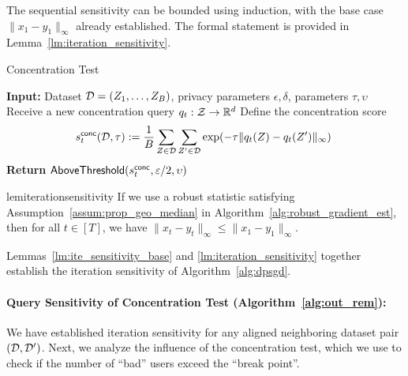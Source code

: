 The sequential sensitivity can be bounded using induction, with the base  
case $\|x_1 - y_1\|_\infty$ already established. The formal statement  
is provided in Lemma~\ref{lm:iteration_sensitivity}.  

\begin{algorithm2e}
\caption{Concentration Test}
\label{alg:out_rem}
\textbf{ Input:} Dataset $\mathcal{D}=(Z_1,\ldots,Z_B)$, privacy parameters $\epsilon,\delta$, parameters $\tau,\upsilon$\;
{ 
Receive a new concentration query $q_t:\mathcal{Z}\to\mathbb{R}^d$\;
Define the concentration score
\begin{align}
\label{eq:concentration_score_def}
    s^{\mathsf{conc}}_t(\mathcal{D},\tau):=\frac{1}{B}\sum_{Z\in\mathcal{D}}\sum_{Z'\in \mathcal{D}}\exp(-\tau\|q_t(Z)-q_t(Z')\|_\infty)\;
\end{align}
\textbf{ Return }$\mathsf{AboveThreshold}(s^{\mathsf{conc}}_t, \varepsilon/2, \upsilon)$
}
\end{algorithm2e}


\begin{restatable}{lem}{iterationsensitivity}
\label{lm:iteration_sensitivity}  
    If we use a robust statistic satisfying Assumption~\ref{assum:prop_geo_median}  
    in Algorithm~\ref{alg:robust_gradient_est}, then for all $t \in [T]$, we have  $\|x_t - y_t\|_\infty \le \|x_1 - y_1\|_\infty$.
\end{restatable}

Lemmas~\ref{lm:ite_sensitivity_base} and \ref{lm:iteration_sensitivity}  
together establish the iteration sensitivity of Algorithm~\ref{alg:dpsgd}.

\paragraph{ Query Sensitivity of Concentration Test (Algorithm~\ref{alg:out_rem}):}
We have established iteration sensitivity for any aligned neighboring  
dataset pair $(\mathcal{D}, \mathcal{D}')$. Next, we analyze the influence of the  
concentration test, which we use to check if the number of ``bad'' users exceed the ``break point''.

